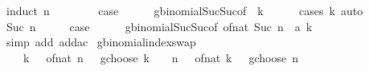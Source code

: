 \begin{isabellebody}
%
\isadelimproof
%
\endisadelimproof
%
\isatagproof
{}\isamarkupfalse%
\ {\isacharparenleft}{\kern0pt}induct\ n{\isacharparenright}{\kern0pt}\isanewline
\ \ \isamarkupfalse%
\ {}\isanewline
\ \ \isamarkupfalse%
\ {\isacharquery}{\kern0pt}case\isanewline
\ \ \ \ \isamarkupfalse%
\ gbinomial{\isacharunderscore}{\kern0pt}Suc{\isacharunderscore}{\kern0pt}Suc{\isacharbrackleft}{\kern0pt}of\ {}\ k{\isacharbrackright}{\kern0pt}\isanewline
\ \ \ \ \isamarkupfalse%
\ {\isacharparenleft}{\kern0pt}cases\ k{\isacharparenright}{\kern0pt}\ auto\isanewline
{}\isamarkupfalse%
\isanewline
\ \ \isamarkupfalse%
\ {\isacharparenleft}{\kern0pt}Suc\ n{\isacharparenright}{\kern0pt}\isanewline
\ \ \isamarkupfalse%
\ \isamarkupfalse%
\ {\isacharquery}{\kern0pt}case\isanewline
\ \ \ \ \isamarkupfalse%
\ gbinomial{\isacharunderscore}{\kern0pt}Suc{\isacharunderscore}{\kern0pt}Suc{\isacharbrackleft}{\kern0pt}of\ {\isachardoublequoteopen}of{\isacharunderscore}{\kern0pt}nat\ {\isacharparenleft}{\kern0pt}Suc\ n{\isacharparenright}{\kern0pt}\ {\isacharcolon}{\kern0pt}{\isacharcolon}{\kern0pt}\ {\isacharprime}{\kern0pt}a{\isachardoublequoteclose}\ k{\isacharbrackright}{\kern0pt}\isanewline
\ \ \ \ \isamarkupfalse%
\ {\isacharparenleft}{\kern0pt}simp\ add{\isacharcolon}{\kern0pt}\ add{\isacharunderscore}{\kern0pt}ac{\isacharparenright}{\kern0pt}\isanewline
{}\isamarkupfalse%
%
\endisatagproof
{\isafoldproof}%
%
\isadelimproof
\isanewline
%
\endisadelimproof
\isanewline
{}\isamarkupfalse%
\ gbinomial{\isacharunderscore}{\kern0pt}index{\isacharunderscore}{\kern0pt}swap{\isacharcolon}{\kern0pt}\isanewline
\ \ {\isachardoublequoteopen}{\isacharparenleft}{\kern0pt}{\isacharparenleft}{\kern0pt}{\isacharminus}{\kern0pt}{}{\isacharparenright}{\kern0pt}\ {\isacharcircum}{\kern0pt}\ k{\isacharparenright}{\kern0pt}\ {\isacharasterisk}{\kern0pt}\ {\isacharparenleft}{\kern0pt}{\isacharparenleft}{\kern0pt}{\isacharminus}{\kern0pt}\ {\isacharparenleft}{\kern0pt}of{\isacharunderscore}{\kern0pt}nat\ n{\isacharparenright}{\kern0pt}\ {\isacharminus}{\kern0pt}\ {}{\isacharparenright}{\kern0pt}\ gchoose\ k{\isacharparenright}{\kern0pt}\ {\isacharequal}{\kern0pt}\ {\isacharparenleft}{\kern0pt}{\isacharparenleft}{\kern0pt}{\isacharminus}{\kern0pt}{}{\isacharparenright}{\kern0pt}\ {\isacharcircum}{\kern0pt}\ n{\isacharparenright}{\kern0pt}\ {\isacharasterisk}{\kern0pt}\ {\isacharparenleft}{\kern0pt}{\isacharparenleft}{\kern0pt}{\isacharminus}{\kern0pt}\ {\isacharparenleft}{\kern0pt}of{\isacharunderscore}{\kern0pt}nat\ k{\isacharparenright}{\kern0pt}\ {\isacharminus}{\kern0pt}\ {}{\isacharparenright}{\kern0pt}\ gchoose\ n{\isacharparenright}{\kern0pt}{\isachardoublequoteclose}\isanewline

\end{isabellebody}
